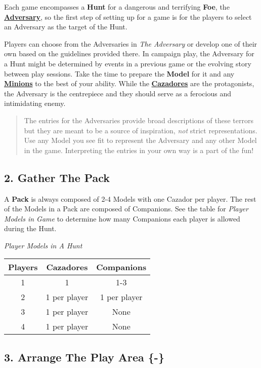 \documentclass[
]{book}
\begin{document}
Each game encompasses a \textbf{Hunt} for a dangerous and terrifying \textbf{Foe}, the \textbf{\protect\hyperlink{foes}{Adversary}}, so the first step of setting up for a game is for the players to select an Adversary as the target of the Hunt.

Players can choose from the Adversaries in \emph{The Adversary} or develop one of their own based on the guidelines provided there. In campaign play, the Adversary for a Hunt might be determined by events in a previous game or the evolving story between play sessions. Take the time to prepare the \textbf{Model} for it and any \textbf{\protect\hyperlink{ftypes}{Minions}} to the best of your ability. While the \textbf{\protect\hyperlink{cazadores}{Cazadores}} are the protagonists, the Adversary is the centrepiece and they should serve as a ferocious and intimidating enemy.

\begin{quote}
The entries for the Adversaries provide broad descriptions of these terrors but they are meant to be a source of inspiration, \emph{not} strict representations. Use any Model you see fit to represent the Adversary and any other Model in the game. Interpreting the entries in your own way is a part of the fun!
\end{quote}

\hypertarget{gather-the-pack}{%
\subsection*{2. Gather The Pack}\label{gather-the-pack}}

A \textbf{Pack} is always composed of 2-4 Models with one Cazador per player. The rest of the Models in a Pack are composed of Companions. See the table for \emph{Player Models in Game} to determine how many Companions each player is allowed during the Hunt.

\emph{Player Models in A Hunt}

\begin{longtable}[]{@{}ccc@{}}
\toprule
Players & Cazadores & Companions\tabularnewline
\midrule
\endhead
1 & 1 & 1-3\tabularnewline
2 & 1 per player & 1 per player\tabularnewline
3 & 1 per player & None\tabularnewline
4 & 1 per player & None\tabularnewline
\bottomrule
\end{longtable}

\hypertarget{arrange}{%
\subsection{3. Arrange The Play Area \{-\}}\label{arrange}}
\end{document}
